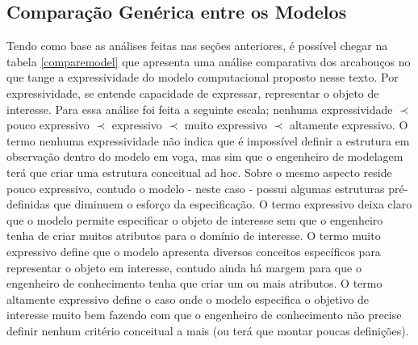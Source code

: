 \subsection{Comparação Genérica entre os Modelos}

Tendo como base as análises feitas nas seções anteriores, é possível chegar na tabela \ref{comparemodel} que apresenta uma análise comparativa dos arcabouços no que tange a expressividade do modelo computacional proposto nesse texto. Por expressividade, se entende capacidade de expressar, representar o objeto de interesse. Para essa análise 
foi feita a seguinte escala; nenhuma expressividade $\prec$ pouco expressivo $\prec$ expressivo $\prec$ muito expressivo $\prec$ altamente expressivo. O termo nenhuma expressividade não indica que é impossível definir a estrutura em observação dentro do modelo em voga, mas sim que o engenheiro de modelagem terá que criar uma estrutura conceitual ad hoc. Sobre o mesmo aspecto reside pouco expressivo, contudo o modelo - neste caso - possui algumas estruturas pré-definidas que diminuem o esforço da especificação. O termo expressivo deixa claro que o modelo permite especificar o objeto de interesse sem que o engenheiro tenha de criar muitos atributos para o domínio de interesse. O termo muito expressivo define que o modelo apresenta diversos conceitos específicos para representar o objeto em interesse, contudo ainda há margem para que o engenheiro de conhecimento tenha que criar um ou mais atributos. O termo altamente expressivo define o caso onde o modelo especifica o objetivo de interesse muito bem fazendo com que o engenheiro de conhecimento não precise definir nenhum critério conceitual a mais (ou terá que montar poucas definições).   

